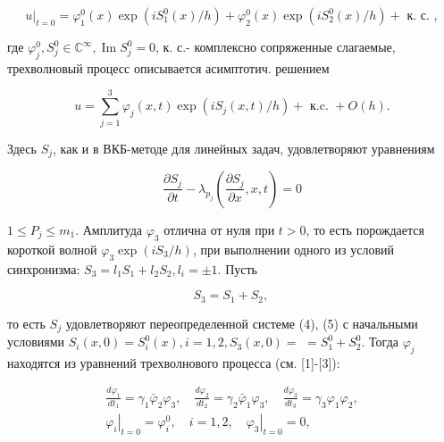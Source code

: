 \documentclass[10pt]{article}
\begin{document}
\[

\left.u\right|_{t=0}=\varphi_{1}^{0}(x) \exp \left(i S_{1}^{0}(x) / h\right)+\varphi_{2}^{0}(x) \exp \left(i S_{2}^{0}(x) / h\right)+\text { к. с. },

\]



где $\varphi_{j}^{0}, S_{j}^{0} \in \mathbb{C}^{\infty}, \operatorname{Im} S_{j}^{0}=0$, к. с.- комплексно сопряженные слагаемые, трехволновый процесс описывается асимптотич. решением



\[

u=\sum_{j=1}^{3} \varphi_{j}(x, t) \exp \left(i S_{j}(x, t) / h\right)+\text { к.c. }+O(h) .

\]



Здесь $S_{j}$, как и в ВКБ-методе для линейных задач, удовлетворяют уравнениям



\[

\frac{\partial S_{j}}{\partial t}-\lambda_{p_{j}}\left(\frac{\partial S_{j}}{\partial x}, x, t\right)=0

\]



$1 \leqslant P_{j} \leqslant m_{1}$. Амплитуда $\varphi_{3}$ отлична от нуля при $t>0$, то есть порождается короткой волной $\varphi_{3} \exp \left(i S_{3} / h\right)$, при выполнении одного из условий синхронизма: $S_{3}=l_{1} S_{1}+l_{2} S_{2}, l_{i}= \pm 1$. Пусть



\[

S_{3}=S_{1}+S_{2} \text {, }

\]



то есть $S_{j}$ удовлетворяют переопределенной системе (4), (5) с начальными условиями $S_{i}(x, 0)=S_{i}^{0}(x), i=1,2, S_{3}(x, 0)=$ $=S_{1}^{0}+S_{2}^{0}$. Тогда $\varphi_{j}$ находятся из уравнений трехволнового процесса (см. [1]-[3]):



\[

\begin{gathered}

\frac{d \varphi_{1}}{d t_{1}}=\gamma_{1} \bar{\varphi}_{2} \varphi_{3}, \quad \frac{d \varphi_{2}}{d t_{2}}=\gamma_{2} \bar{\varphi}_{1} \varphi_{3}, \quad \frac{d \varphi_{3}}{d t_{3}}=\gamma_{3} \varphi_{1} \varphi_{2}, \\

\left.\varphi_{i}\right|_{t=0}=\varphi_{i}^{0}, \quad i=1,2,\left.\quad \varphi_{3}\right|_{t=0}=0,

\end{gathered}

\]
\end{document}
